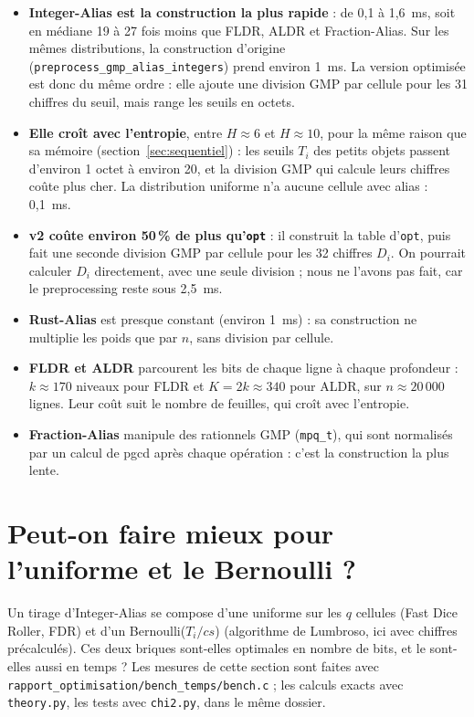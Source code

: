 \documentclass[11pt,a4paper]{article}
\newcommand{\code}[1]{\texttt{#1}}
\newcommand{\cs}{\mathit{cs}}
\begin{document}
\begin{itemize}
\item \textbf{Integer-Alias est la construction la plus rapide} : de 0,1 à 1,6~ms, soit
  en médiane 19 à 27 fois moins que FLDR, ALDR et Fraction-Alias. Sur les mêmes distributions, la
  construction d'origine (\code{preprocess\_gmp\_alias\_integers}) prend environ 1~ms.
  La version optimisée est donc du même ordre : elle ajoute une division GMP par cellule
  pour les 31 chiffres du seuil, mais range les seuils en octets.
\item \textbf{Elle croît avec l'entropie}, entre $H \approx 6$ et $H \approx 10$, pour
  la même raison que sa mémoire (section~\ref{sec:sequentiel}) : les seuils $T_i$ des
  petits objets passent d'environ 1 octet à environ 20, et la division GMP qui calcule
  leurs chiffres coûte plus cher. La distribution uniforme n'a aucune cellule avec alias :
  0,1~ms.
\item \textbf{v2 coûte environ 50\,\% de plus qu'\code{opt}} : il construit la table
  d'\code{opt}, puis fait une seconde division GMP par cellule pour les 32 chiffres $D_i$.
  On pourrait calculer $D_i$ directement, avec une seule division ; nous ne l'avons pas
  fait, car le preprocessing reste sous 2,5~ms.
\item \textbf{Rust-Alias} est presque constant (environ 1~ms) : sa construction ne
  multiplie les poids que par $n$, sans division par cellule.
\item \textbf{FLDR et ALDR} parcourent les bits de chaque ligne à chaque profondeur :
  $k \approx 170$ niveaux pour FLDR et $K = 2k \approx 340$ pour ALDR, sur
  $n \approx 20\,000$ lignes. Leur coût suit le nombre de feuilles, qui croît avec
  l'entropie.
\item \textbf{Fraction-Alias} manipule des rationnels GMP (\code{mpq\_t}), qui sont
  normalisés par un calcul de pgcd après chaque opération : c'est la construction la
  plus lente.
\end{itemize}

\section{Peut-on faire mieux pour l'uniforme et le Bernoulli ?}
\label{sec:optimalite}

Un tirage d'Integer-Alias se compose d'une uniforme sur les $q$ cellules (Fast Dice
Roller, FDR) et d'un Bernoulli($T_i/\cs$) (algorithme de Lumbroso, ici avec chiffres
précalculés). Ces deux briques sont-elles optimales en nombre de bits, et le sont-elles
aussi en temps ? Les mesures de cette section sont faites avec
\code{rapport\_optimisation/bench\_temps/bench.c} ; les calculs exacts avec
\code{theory.py}, les tests avec \code{chi2.py}, dans le même dossier.
\end{document}
